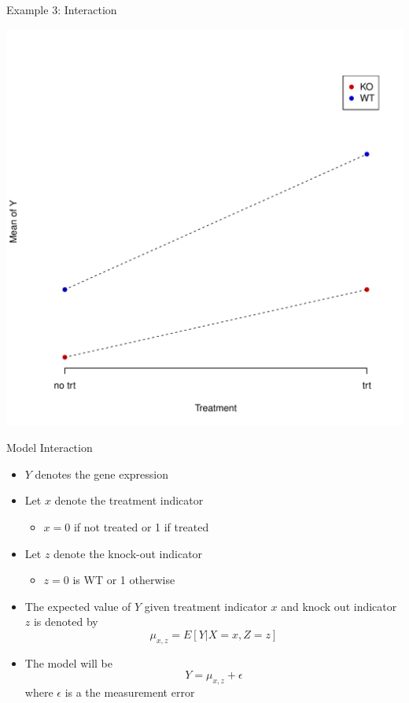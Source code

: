 \documentclass[xcolor=x11names,compress]{beamer}\usepackage[]{graphicx}\usepackage[]{color}
\newenvironment{knitrout}{}{} %
\begin{document}
\begin{frame}{Example 3: Interaction}
\begin{knitrout}\tiny
{}\color{fgcolor}

{\centering \includegraphics[width=.6\linewidth]{figure/beamer-unnamed-chunk-91-1} 

}



\end{knitrout}
\end{frame}




\begin{frame}{Model Interaction}
  \begin{itemize}
  \item $Y$ denotes the gene expression
  \item Let $x$ denote the treatment indicator
    \begin{itemize}
    \item $x=0$ if not treated or 1 if treated
    \end{itemize}
  \item Let $z$ denote the knock-out indicator
    \begin{itemize}
    \item $z=0$ is WT or 1 otherwise
    \end{itemize}
  \item The expected value of $Y$ given treatment indicator $x$ and knock out
       indicator $z$ is denoted by
       \begin{equation*}
         \mu_{x,z}=E[Y|X=x,Z=z]
       \end{equation*}
  \item The model will be
    \begin{equation*}
      Y=  \mu_{x,z} + \epsilon
    \end{equation*}
    where $\epsilon$ is a the measurement error
  \end{itemize}
\end{frame}
\end{document}
